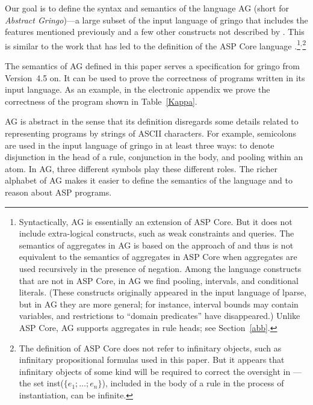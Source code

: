 \documentclass{tlp}
\begin{document}
Our goal is to define the syntax and semantics of the language AG
(short for {\sl Abstract Gringo\/})---a large subset of the input language
of {\sc gringo} that includes the features mentioned previously 
and a few other constructs not described by  \citeyear{har14a}.
This is
similar to the work that has led to the definition of the ASP
Core language \cite{aspcore2}.\footnote{Syntactically, AG is essentially
an extension of ASP Core.  But it does not include extra-logical
constructs, such as weak constraints and queries.  The semantics of
aggregates in AG is based on the approach of  \citeyear{fer05} 
and thus is not
equivalent to the semantics of aggregates in ASP Core when aggregates
are used recursively in the presence of negation.  Among the language 
constructs that are not in
ASP Core, in AG we find pooling, intervals, and conditional literals.
(These constructs originally appeared in the input language of {\sc lparse},
but in AG they are more general; for instance, interval bounds may
contain variables,
and restrictions to ``domain predicates'' have disappeared.)  Unlike
ASP Core, AG supports aggregates in rule heads; see
Section~\ref{abb}.}$^,$\footnote{The definition of ASP Core does not refer to
infinitary objects, such as infinitary propositional formulas used in this
paper.  But it appears that infinitary objects of some kind will be required
to correct the oversight in \cite[Section~2.2]{aspcore2}---the set
\hbox{inst($\{e_1;\dots;e_n\}$)}, included in the body of a rule in the
process of instantiation, can be infinite.}

The semantics of AG defined in this paper serves a specification for
{\sc gringo} from Version~4.5 on.  It can be used to prove
the correctness of programs written in its input language.
As an example, in the electronic appendix we prove the
correctness of the program shown in Table~\ref{Kappa}.

AG is abstract in the sense that its definition disregards
some details related to representing programs by strings of ASCII characters.
For example, semicolons are used in the input language of {\sc gringo} in
at least
three ways: to denote disjunction in the head of a rule, conjunction in the
body, and pooling within an atom.  In AG, three different symbols play
these different roles.  The richer alphabet of AG makes it easier to define the
semantics of the language and to reason about ASP programs.

\end{document}
